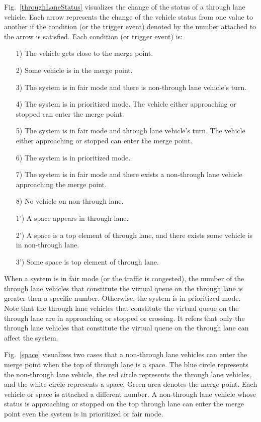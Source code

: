 \documentclass[10pt, conference, compsocconf]{IEEEtran}
\begin{document}
Fig.~\ref{throughLaneStatus} visualizes the change of the status
of a through lane vehicle.  Each arrow represents the change of the
vehicle status from one value to another if the condition (or the
trigger event) denoted by the number attached to the arrow is
satisfied.  Each condition (or trigger event) is:
\begin{itemize}[]
    \item[1)] The vehicle gets close to the merge point. %
    \item[2)] Some vehicle is in the merge point. %
    \item[3)] The system is in fair mode and there is non-through lane vehicle's turn. %
    \item[4)] The system is in prioritized mode. The vehicle either approaching or stopped 
    can enter the merge point. %
    \item[5)] The system is in fair mode and through lane vehicle's turn. The vehicle either 
    approaching or stopped can enter the merge point. %
    \item[6)] The system is in prioritized mode. %
    \item[7)] The system is in fair mode and there exists a non-through lane vehicle approaching the 
    merge point. %
    \item[8)] No vehicle on non-through lane.
    \item[1')] A space appears in through lane. %
    \item[2')] A space is a top element of through lane, and there exists some vehicle 
    is in non-through lane. %
    \item[3')] Some space is top element of through lane. %
\end{itemize}

When a system is in fair mode (or the traffic is congested), the number of the through lane
vehicles that constitute the virtual queue on the through lane is
greater then a specific number. Otherwise, the system is in prioritized mode.
Note that the through lane vehicles that constitute the virtual queue on the
through lane are in approaching or stopped or crossing.
It refers that only the through lane vehicles that constitute the virtual queue
on the through lane can affect the system. 

Fig.~\ref{space} visualizes two cases that a non-through lane vehicles can enter
the merge point when the top of through lane is a space.
The blue circle
represents the non-through lane vehicle, the red circle represents the
through lane vehicles, and the white circle represents a space.  Green
area denotes the merge point. Each vehicle or space is attached a
different number.
A non-through lane vehicle whose status is approaching or stopped on the top through lane
can enter the merge point even the system is in prioritized or fair mode.
\end{document}
